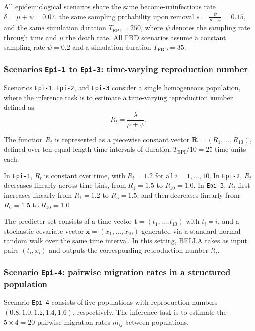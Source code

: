 All epidemiological scenarios share the same become-uninfectious rate $\delta = \mu + \psi = 0.07$, the same sampling probability upon removal $s = \frac{\psi}{\mu + \psi} = 0.15$, and the same simulation duration $T_{\text{EPI}} = 250$, where $\psi$ denotes the sampling rate through time and $\mu$ the death rate. All FBD scenarios assume a constant sampling rate $\psi = 0.2$ and a simulation duration $T_{\text{FBD}} = 35$.

\subsubsection{Scenarios \texttt{Epi-1} to \texttt{Epi-3}: time-varying reproduction number}

Scenarios \texttt{Epi-1}, \texttt{Epi-2}, and \texttt{Epi-3} consider a single homogeneous population, where the inference task is to estimate a time-varying reproduction number defined as
\[
R_t = \frac{\lambda}{\mu + \psi}.
\]

The function $R_t$ is represented as a piecewise constant vector $\mathbf{R} = (R_1, \dots, R_{10})$, defined over ten equal-length time intervals of duration $T_{\text{EPI}} / 10 = 25$ time units each.

In \texttt{Epi-1}, $R_t$ is constant over time, with $R_i = 1.2$ for all $i = 1, \dots, 10$. In \texttt{Epi-2}, $R_t$ decreases linearly across time bins, from $R_1 = 1.5$ to $R_{10} = 1.0$. In \texttt{Epi-3}, $R_t$ first increases linearly from $R_1 = 1.2$ to $R_5 = 1.5$, and then decreases linearly from $R_6 = 1.5$ to $R_{10} = 1.0$.

The predictor set consists of a time vector $\mathbf{t} = (t_1, \dots, t_{10})$ with $t_i = i$, and a stochastic covariate vector $\mathbf{x} = (x_1, \dots, x_{10})$ generated via a standard normal random walk over the same time interval.
In this setting, BELLA takes as input pairs $(t_i, x_i)$ and outputs the corresponding reproduction number $R_i$.

\subsubsection{Scenario \texttt{Epi-4}: pairwise migration rates in a structured population}

Scenario \texttt{Epi-4} consists of five populations with reproduction numbers $(0.8, 1.0, 1.2, 1.4, 1.6)$, respectively. The inference task is to estimate the $5 \times 4 = 20$ pairwise migration rates $m_{ij}$ between populations.

